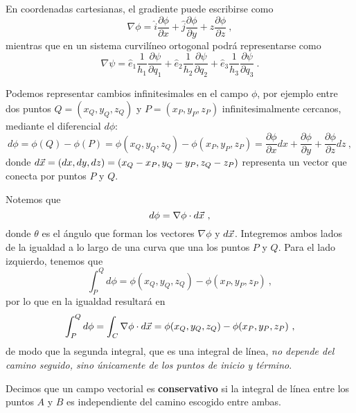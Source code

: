 En coordenadas cartesianas, el gradiente puede escribirse como 
\begin{equation}
    \nabla \phi = \hat{i} \frac{\partial \phi}{\partial x} + \hat{j} \frac{\partial \phi}{\partial y} + \hat{z} \frac{\partial \phi}{\partial z} \ ,
\end{equation}
mientras que en un sistema curvilíneo ortogonal podrá representarse como 
\begin{equation}
    \nabla \psi = \hat{e}_1 \frac{1}{h_1} \frac{\partial \psi}{\partial q_1} + \hat{e}_2 \frac{1}{h_2} \frac{\partial \psi}{\partial q_2} + \hat{e}_3 \frac{1}{h_3} \frac{\partial \psi}{\partial q_3} \ .
\end{equation}

Podemos representar cambios infinitesimales en el campo $\phi$, por ejemplo entre dos puntos $Q = (x_Q, y_Q, z_Q)$ y $P = (x_P, y_P, z_P)$ infinitesimalmente cercanos, mediante el diferencial $d\phi$:
\begin{equation*}
    d\phi = \phi(Q) - \phi(P) = \phi(x_Q, y_Q, z_Q) - \phi(x_P, y_P, z_P) = \frac{\partial \phi}{\partial x} dx + \frac{\partial \phi}{\partial y} + \frac{\partial \phi}{\partial z} dz \ ,
\end{equation*}
donde $d\vec{x} = (dx, dy, dz) = (x_Q - x_P, y_Q - y_P, z_Q - z_P)$ representa un vector que conecta por puntos $P$ y $Q$.

Notemos que 
\begin{equation*}
    d\phi = \nabla \phi \cdot d\vec{x} \ ,
\end{equation*}
donde $\theta$ es el ángulo que forman los vectores $\nabla \phi$ y $d\vec{x}$. Integremos ambos lados de la igualdad a lo largo de una curva que una los puntos $P$ y $Q$. Para el lado izquierdo, tenemos que
\begin{equation*}
    \int_P^Q d\phi = \phi(x_Q, y_Q, z_Q) - \phi(x_P, y_P, z_P) \ ,
\end{equation*}
por lo que en la igualdad resultará en 
\begin{equation}
    \int_P^Q d\phi = \int_C \nabla \phi \cdot d\vec{x} = \phi(x_Q, y_Q, z_Q) - \phi(x_P, y_P, z_P) \ ,
\end{equation}
de modo que la segunda integral, que es una integral de línea, \emph{no depende del camino seguido, sino únicamente de los puntos de inicio y término}.

\begin{defi}
    Decimos que un campo vectorial es \textbf{conservativo} si la integral de línea entre los puntos $A$ y $B$ es independiente del camino escogido entre ambas.
\end{defi}

